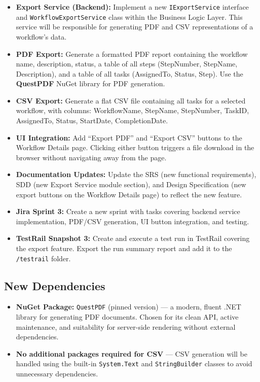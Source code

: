 \documentclass[12pt]{article}
\begin{document}
\begin{itemize}
    \item \textbf{Export Service (Backend):} Implement a new \texttt{IExportService}
    interface and \texttt{WorkflowExportService} class within the Business Logic Layer.
    This service will be responsible for generating PDF and CSV representations of a
    workflow's data.

    \item \textbf{PDF Export:} Generate a formatted PDF report containing the workflow
    name, description, status, a table of all steps (StepNumber, StepName, Description),
    and a table of all tasks (AssignedTo, Status, Step). Use the \textbf{QuestPDF} NuGet
    library for PDF generation.

    \item \textbf{CSV Export:} Generate a flat CSV file containing all tasks for a selected
    workflow, with columns: WorkflowName, StepName, StepNumber, TaskID, AssignedTo, Status,
    StartDate, CompletionDate.

    \item \textbf{UI Integration:} Add ``Export PDF'' and ``Export CSV'' buttons to the
    Workflow Details page. Clicking either button triggers a file download in the browser
    without navigating away from the page.

    \item \textbf{Documentation Updates:} Update the SRS (new functional requirements),
    SDD (new Export Service module section), and Design Specification (new export buttons
    on the Workflow Details page) to reflect the new feature.

    \item \textbf{Jira Sprint 3:} Create a new sprint with tasks covering backend service
    implementation, PDF/CSV generation, UI button integration, and testing.

    \item \textbf{TestRail Snapshot 3:} Create and execute a test run in TestRail covering
    the export feature. Export the run summary report and add it to the
    \texttt{/testrail} folder.
\end{itemize}

\subsection{New Dependencies}

\begin{itemize}
    \item \textbf{NuGet Package:} \texttt{QuestPDF} (pinned version) --- a modern,
    fluent .NET library for generating PDF documents. Chosen for its clean API, active
    maintenance, and suitability for server-side rendering without external dependencies.
    \item \textbf{No additional packages required for CSV} --- CSV generation will be
    handled using the built-in \texttt{System.Text} and \texttt{StringBuilder} classes to
    avoid unnecessary dependencies.
\end{itemize}
\end{document}
